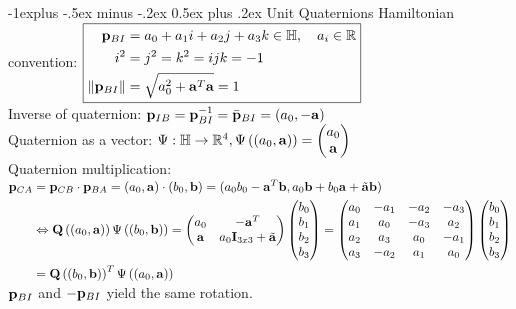 \documentclass[10pt,landscape,a4paper]{article}
\makeatletter
\renewcommand{\subsection}{\@startsection{subsection}{2}{0mm}%
                                {-1explus -.5ex minus -.2ex}%
                                {0.5ex plus .2ex}%
                                {\normalfont\normalsize\bfseries}}
\makeatother
\begin{document}
\begin{multicols}{2}
\subsection{Unit Quaternions}
Hamiltonian convention: 
$\boxed{\begin{aligned}\mathbf p_{BI} &= a_0 + a_1 i + a_2 j + a_3 k \in \mathbb{H}, \quad a_i \in \mathbb{R}  \\
i^2 &= j^2=k^2 = ijk = -1 \\
\| \mathbf p_{BI} \| &= \sqrt{a_0^2 + \mathbf a^T\mathbf a} = 1
\end{aligned}}$  \\

Inverse of quaternion: $\mathbf p_{IB} = \mathbf p_{BI}^{-1} = \bar{\mathbf p}_{BI} = (a_0, -\mathbf a)$ \\
Quaternion as a vector: $\Psi: \mathbb{H} \rightarrow \mathbb{R}^4, \Psi\left ( (a_0, \mathbf a) \right) = \begin{pmatrix} a_0 \\ \mathbf a \end{pmatrix}$ \\
Quaternion multiplication: $\begin{aligned}\mathbf p_{CA} &= \mathbf p_{CB} \cdot \mathbf p_{BA} = (a_0, \mathbf a)\cdot(b_0, \mathbf b) = (a_0 b_0 - \mathbf a^{T} \mathbf b, a_{0} \mathbf b + b_0 \mathbf a + \tilde{\mathbf a} \mathbf b)  \\
	  &\Leftrightarrow \mathbf Q\left((a_0, \mathbf a)\right)\Psi\left((b_0, \mathbf b)\right) = \begin{pmatrix}a_0 & -\mathbf a^T \\  \mathbf a & a_0\mathbf I_{3x3}+\tilde{\mathbf a} \\ \end{pmatrix} \begin{pmatrix} b_0 \\ b_1 \\ b_2 \\ b_3 \end{pmatrix} 
	  = \begin{pmatrix} 
 a_0 & -a_1 & -a_2 & -a_3 \\
 a_1 &  a_0 & -a_3 &  a_2 \\
 a_2 &  a_3 &  a_0 & -a_1 \\
 a_3 & -a_2 &  a_1 &  a_0 \\ \end{pmatrix}\begin{pmatrix} b_0 \\ b_1 \\ b_2 \\ b_3 \end{pmatrix}  \\
 &= \mathbf Q\left((b_0, \mathbf b)\right)^T\Psi\left((a_0, \mathbf a)\right) \\
\end{aligned}$ \\
$\mathbf p_{BI}$ and $-\mathbf p_{BI}$ yield the same rotation. \\

\end{multicols}
\end{document}
